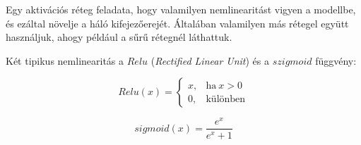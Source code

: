 
Egy aktivációs réteg feladata, hogy valamilyen nemlinearitást vigyen a modellbe, és ezáltal növelje a háló 
kifejezőerejét. Általában valamilyen más rétegel együtt használjuk, ahogy például a sűrű rétegnél láthattuk.



Két tipikus nemlinearitás a $ Relu $ (\textit{Rectified Linear Unit}) és a $ szigmoid $ függvény:

\[  Relu(x) =  
 \begin{cases}
x, & \text{ha}\ x > 0 \\
0, & \text{különben}
\end{cases} 
 \]


\[  sigmoid(x) = \dfrac{e^x}{e^x + 1}  \]



